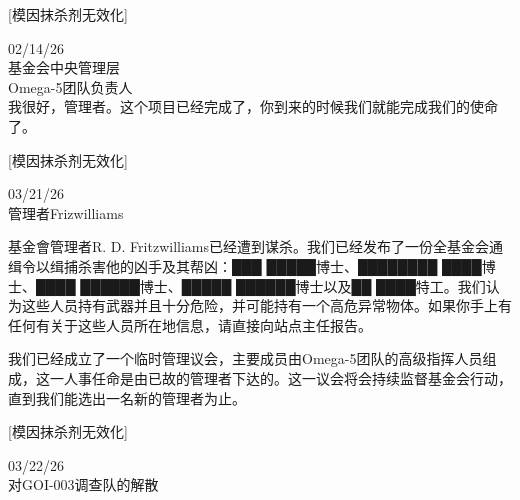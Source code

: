 \begin{scpboxc}
{[模因抹杀剂无效化]}
\end{scpboxc}

02/14/26 \\
基金会中央管理层 \\
Omega-5团队负责人 \\

我很好，管理者。这个项目已经完成了，你到来的时候我们就能完成我们的使命了。


\begin{scpboxc}
{[模因抹杀剂无效化]}
\end{scpboxc}

\begin{scpboxbbwm}


\Gg{[由监察者命令编辑]}


 03/21/26 \\
管理者Frizwilliams

基金會管理者R. D. Fritzwilliams已经遭到谋杀。我们已经发布了一份全基金会通缉令以缉捕杀害他的凶手及其帮凶：███ █████博士、████████ ████博士、████ ██████博士、█████ ██████博士以及██ ████特工。我们认为这些人员持有武器并且十分危险，并可能持有一个高危异常物体。如果你手上有任何有关于这些人员所在地信息，请直接向站点主任报告。

我们已经成立了一个临时管理议会，主要成员由Omega-5团队的高级指挥人员组成，这一人事任命是由已故的管理者下达的。这一议会将会持续监督基金会行动，直到我们能选出一名新的管理者为止。

\end{scpboxbbwm}

\begin{scpboxc}
{[模因抹杀剂无效化]}
\end{scpboxc}

\begin{scpboxbbwm}



 03/22/26 \\
对GOI-003调查队的解散








\end{scpboxbbwm}

